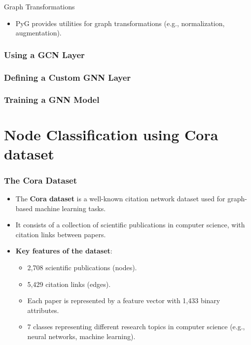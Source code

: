 \documentclass{beamer}
\begin{document}
\begin{frame}{Graph Transformations}
    \begin{itemize}
        \item PyG provides utilities for graph transformations (e.g., normalization, augmentation).
    \end{itemize}

\end{frame}

\begin{frame}
\frametitle{Using a GCN Layer}

\end{frame}

\begin{frame}
\frametitle{Defining a Custom GNN Layer}

\end{frame}

\begin{frame}
\frametitle{Training a GNN Model}

\end{frame}


\section{Node Classification using Cora dataset}
\begin{frame}
\frametitle{The Cora Dataset}

\begin{itemize}
    \item The \textbf{Cora dataset} is a well-known citation network dataset used for graph-based machine learning tasks.
    \item It consists of a collection of scientific publications in computer science, with citation links between papers.
    \item \textbf{Key features of the dataset}:
    \begin{itemize}
        \item 2,708 scientific publications (nodes).
        \item 5,429 citation links (edges).
        \item Each paper is represented by a feature vector with 1,433 binary attributes.
        \item 7 classes representing different research topics in computer science (e.g., neural networks, machine learning).
    \end{itemize}
\end{itemize}

\end{frame}
\end{document}
